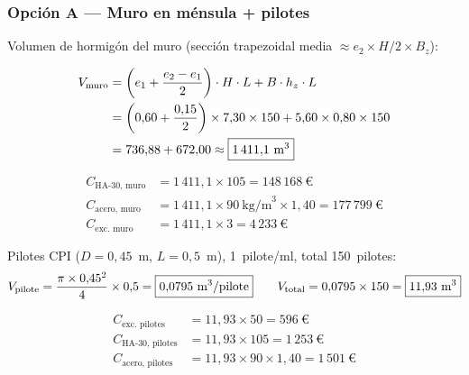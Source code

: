 \subsubsection{Opción A — Muro en ménsula + pilotes}

Volumen de hormigón del muro (sección trapezoidal media $\approx e_2 \times H/2 \times B_z$):

\begin{align*}
  V_\text{muro} &= \left(e_1 + \frac{e_2-e_1}{2}\right) \cdot H \cdot L
                 + B \cdot h_z \cdot L \\
               &= \left(0{,}60 + \frac{0{,}15}{2}\right) \times 7{,}30 \times 150
                 + 5{,}60 \times 0{,}80 \times 150 \\
               &= 736{,}88 + 672{,}00 \approx \boxed{1\,411{,}1~\text{m}^3}
\end{align*}

\begin{align*}
  C_\text{HA-30, muro}    &= 1\,411{,}1 \times 105 = 148\,168~\text{€} \\
  C_\text{acero, muro}    &= 1\,411{,}1 \times 90~\text{kg/m}^3 \times 1{,}40
                          = 177\,799~\text{€} \\
  C_\text{exc. muro}      &= 1\,411{,}1 \times 3 = 4\,233~\text{€}
\end{align*}

Pilotes CPI ($D = 0{,}45$~m, $L = 0{,}5$~m), 1~pilote/ml, total 150~pilotes:
\[
  V_\text{pilote} = \frac{\pi \times 0{,}45^2}{4} \times 0{,}5
                  = \boxed{0{,}0795~\text{m}^3/\text{pilote}}
  \qquad
  V_\text{total} = 0{,}0795 \times 150 = \boxed{11{,}93~\text{m}^3}
\]

\begin{align*}
  C_\text{exc. pilotes}   &= 11{,}93 \times 50   =    596~\text{€} \\
  C_\text{HA-30, pilotes} &= 11{,}93 \times 105  =  1\,253~\text{€} \\
  C_\text{acero, pilotes} &= 11{,}93 \times 90 \times 1{,}40 = 1\,501~\text{€}
\end{align*}

